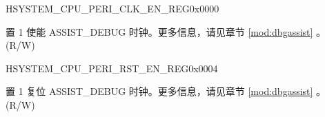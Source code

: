 \begin{register}{H}{SYSTEM\_CPU\_PERI\_CLK\_EN\_REG}{0x0000}\label{regdesc:SYSTEMCPUPERICLKENREG}
%
%
%
\regnewline%
\begin{regdesc}\begin{reglist}
\label{fielddesc:SYSTEMCLKENASSISTDEBUG}\item [SYSTEM\_CLK\_EN\_ASSIST\_DEBUG] 置 1 使能 ASSIST\_DEBUG 时钟。更多信息，请见章节 \ref{mod:dbgassist}
\textit{}。(R/W)
\end{reglist}\end{regdesc}
\end{register}


\begin{register}{H}{SYSTEM\_CPU\_PERI\_RST\_EN\_REG}{0x0004}\label{regdesc:SYSTEMCPUPERIRSTENREG}
%
%
%
\regnewline%
\begin{regdesc}\begin{reglist}
\label{fielddesc:SYSTEMRSTENASSISTDEBUG}\item [SYSTEM\_RST\_EN\_ASSIST\_DEBUG] 置 1 复位 ASSIST\_DEBUG 时钟。更多信息，请见章节 \ref{mod:dbgassist}
\textit{}。(R/W)
\end{reglist}\end{regdesc}
\end{register}

